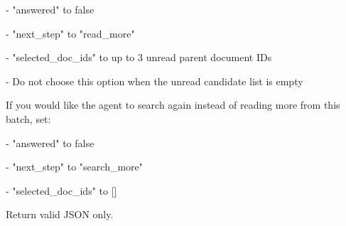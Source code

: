 \begin{tcolorbox}[colback=white, colframe=my-green, coltitle=black, parskip=5mm, title=\textbf{Hop Resolve}, halign=flush left, enhanced, breakable, skin first=enhanced, skin middle=enhanced, skin last=enhanced]
\begin{scriptsize}
- "answered" to false\par
- "next\_step" to "read\_more"\par
- "selected\_doc\_ids" to up to 3 unread parent document IDs\par
- Do not choose this option when the unread candidate list is empty\par
\mbox{}\par
If you would like the agent to search again instead of reading more from this batch, set:\par
- "answered" to false\par
- "next\_step" to "search\_more"\par
- "selected\_doc\_ids" to []\par
\mbox{}\par
Return valid JSON only.\par
\end{scriptsize}
\end{tcolorbox}
